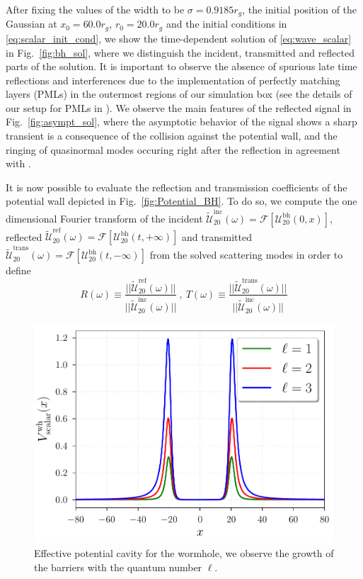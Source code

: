 \documentclass[article,aps,nofootinbib,twocolumn,superscriptaddress]{revtex4-1}
\begin{document}
After fixing the values of the width to be $\sigma=0.9185r_g$, the initial position of the Gaussian at $x_0=60.0r_g$, $r_0=20.0r_g$ and the initial conditions in \eqref{eq:scalar_init_cond}, we show the time-dependent solution of \eqref{eq:wave_scalar} in Fig.~\ref{fig:bh_sol}, where we distinguish the incident, transmitted and reflected parts of the solution. It is important to observe the absence of spurious late time reflections and interferences due to the implementation of perfectly matching layers (PMLs) in the outermost regions of our simulation box (see the details of our setup for PMLs in \citep{Frolov:2017asg}). We observe the main features of the reflected signal in Fig.~\ref{fig:asympt_sol}, where the asymptotic behavior of the signal shows a sharp transient is a consequence of the collision against the potential wall, and the ringing of quasinormal modes occuring right after the reflection in agreement with \citep{Petrich:1985csm}. 

It is now possible to evaluate the reflection and transmission coefficients of the potential wall depicted in Fig.~\ref{fig:Potential_BH}. To do so, we compute the one dimensional Fourier transform of the incident $\tilde{\mathcal{U}}_{20}^{\mathrm{inc}}(\omega)=\mathcal{F}[\mathcal{U}^{\mathrm{bh}}_{20}(0,x)]$, reflected $\tilde{\mathcal{U}}_{20}^{\mathrm{ref}}(\omega)=\mathcal{F}[\mathcal{U}^{\mathrm{bh}}_{20}(t,+\infty)]$ and transmitted $\tilde{\mathcal{U}}_{20}^{\mathrm{trans}}(\omega)=\mathcal{F}[\mathcal{U}^{\mathrm{bh}}_{20}(t,-\infty)]$ from the solved scattering modes in order to define
\begin{equation}
R(\omega)\equiv \frac{||\tilde{\mathcal{U}}_{20}^{\mathrm{ref}}(\omega)||}{||\tilde{\mathcal{U}}_{20}^{\mathrm{inc}}(\omega)||}~,~T(\omega)\equiv \frac{||\tilde{\mathcal{U}}_{20}^{\mathrm{trans}}(\omega)||}{||\tilde{\mathcal{U}}_{20}^{\mathrm{inc}}(\omega)||}
\label{eq:ref_and_trans}
\end{equation}
\begin{figure}[t]
\centering
\includegraphics[width=.45\textwidth]{figures/potential_scalar.pdf}
\caption{\label{fig:potential_wh} Effective potential cavity for the wormhole, we observe the growth of the barriers with the quantum number $\ell$.}
\end{figure}
\end{document}
